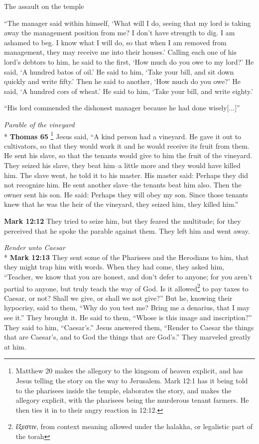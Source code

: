 \documentclass[10pt,twoside]{article} %
\newcommand{\quotesize}{\normalsize{}}
\newenvironment{quotetext}{\begingroup\quotesize}{\endgroup}
\newcommand{\intex}[1]{\index[texts]{#1}}
\newcommand{\bible}[2]{\begin{quotetext}\textbf{#1}\intex{#1} #2\end{quotetext}}
\newcommand{\gospelmark}[2]{\bible{Mark #1}{#2}}
\newcommand{\thomas}[2]{\bible{Thomas #1}{#2}}
\newcommand{\subhead}[1]{\emph{#1}\\*}
\begin{document}
\begin{section}{The assault on the temple}
{   ``The manager said within himself, `What will I do, seeing that my lord is taking away the management position from me? I don't have strength to dig. I am ashamed to beg.    I know what I will do, so that when I am removed from management, they may receive me into their houses.'    Calling each one of his lord's debtors to him, he said to the first, `How much do you owe to my lord?'    He said, `A hundred batos of oil.' He said to him, `Take your bill, and sit down quickly and write fifty.'    Then he said to another, `How much do you owe?' He said, `A hundred cors of wheat.' He said to him, `Take your bill, and write eighty.'

   ``His lord commended the dishonest manager because he had done wisely[...]''
}

\subhead{Parable of the vineyard}
\thomas{65}{\footnote{Matthew 20 makes the allegory to the kingsom of heaven explicit, and has Jesus telling the story on the way to Jerusalem.
Mark 12:1 has it being told to the pharisees inside the temple, 
elaborates the story, and makes the allegory explicit, with the pharisees being the murderous tenant farmers.
He then ties it in to their angry reaction in 12:12.}
Jesus said, ``A kind person had a vineyard. He gave it out to cultivators, so that
they would work it and he would receive its fruit from them. He sent
his slave, so that the tenants would give to him the fruit of the
vineyard. They seized his slave, they beat him--a little more and they
would have killed him. The slave went, he told it to his master. His
master said: Perhaps they did not recognize him. He sent another
slave--the tenants beat him also. Then the owner sent his son. He
said: Perhaps they will obey my son. Since those tenants knew that he
was the heir of the vineyard, they seized him, they killed
him.''
}

\gospelmark{12:12}{
 They tried to seize him, but they feared the multitude; for they perceived that he spoke the parable against them.
They left him and went away.
}

\subhead{Render unto Caesar}
\gospelmark{12:13}{
They sent some of the Pharisees and the Herodians to him, that they might trap him with words.   When they had come, they asked him, ``Teacher, we know that you are honest, and don't defer to anyone; for you aren't partial to anyone, but truly teach the way of God. Is it 
allowed\footnote{ἔξεστιν, from context meaning allowed under the halakha, or legalistic part of the torah}
 to pay taxes to Caesar, or not?   Shall we give, or shall we not give?''
But he, knowing their hypocrisy, said to them, ``Why do you test me? Bring me a denarius, that I may see it.''
  They brought it.
He said to them, ``Whose is this image and inscription?''
They said to him, ``Caesar's.''
  Jesus answered them, ``Render to Caesar the things that are Caesar's, and to God the things that are God's.''
They marveled greatly at him. 
}


\end{section}
\end{document}
